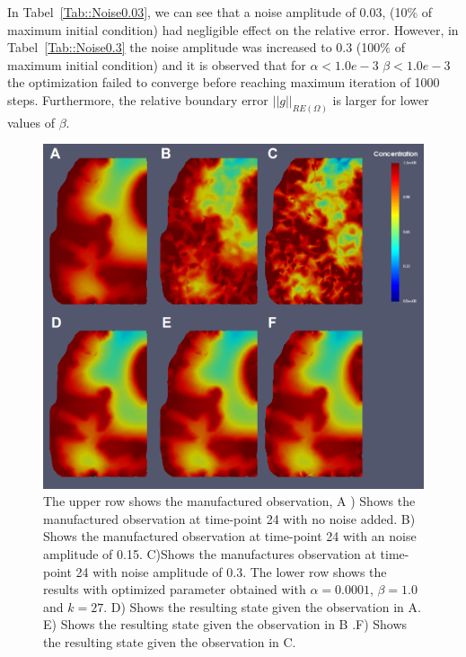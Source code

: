 \documentclass[11pt,a4paper]{article}
\begin{document}
In Tabel~\ref{Tab::Noise0.03}, we can see that a noise amplitude of 0.03, (10$\%$ of maximum initial condition) had negligible effect on the relative error. However, in Tabel~\ref{Tab::Noise0.3} the noise amplitude was increased to 0.3 (100$\%$ of maximum initial condition) and it is observed that for  $\alpha < 1.0e-3$  $\beta < 1.0e-3$ the optimization failed to converge before reaching maximum iteration of 1000 steps. Furthermore, the relative boundary error $||g||_{RE(\Omega)}$ is  larger for lower values of $\beta$. 

\begin{figure}
\centering
\includegraphics[scale=0.4]{27-12-hours-scale-0-1-3.png}  
\caption{The upper row shows the manufactured observation, A ) Shows the manufactured observation at time-point 24 with no noise added. B) Shows the manufactured observation at time-point 24 with an noise amplitude of 0.15. C)Shows the manufactures observation at time-point 24 with noise amplitude of 0.3. The lower row shows the results with optimized parameter obtained with $\alpha=0.0001$, $\beta=1.0$ and $k=27$. D) Shows the resulting state given the observation in A. E)  Shows the resulting state given the observation in B .F) Shows the resulting state given the observation in C. }
\label{12hourswithnoise}
\end{figure}
\end{document}
